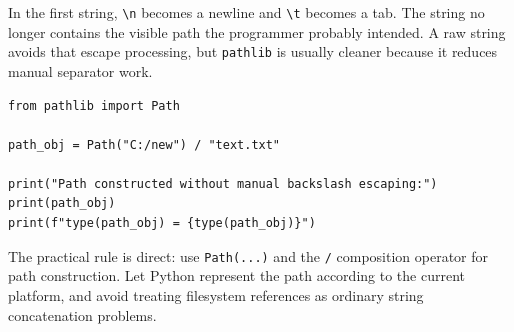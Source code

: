 In the first string, \texttt{\textbackslash n} becomes a newline and \texttt{\textbackslash t} becomes a tab. The string no longer contains the visible path the programmer probably intended. A raw string avoids that escape processing, but \texttt{pathlib} is usually cleaner because it reduces manual separator work.

\begin{verbatim}
from pathlib import Path

path_obj = Path("C:/new") / "text.txt"

print("Path constructed without manual backslash escaping:")
print(path_obj)
print(f"type(path_obj) = {type(path_obj)}")
\end{verbatim}

The practical rule is direct: use \texttt{Path(...)} and the \texttt{/} composition operator for path construction. Let Python represent the path according to the current platform, and avoid treating filesystem references as ordinary string concatenation problems.
